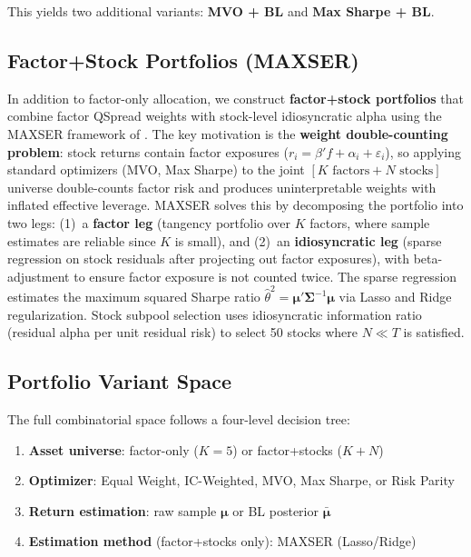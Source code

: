 \documentclass[12pt,a4paper]{article}
\begin{document}
This yields two additional variants: \textbf{MVO + BL} and \textbf{Max Sharpe + BL}.

\subsection{Factor+Stock Portfolios (MAXSER)}

In addition to factor-only allocation, we construct \textbf{factor+stock portfolios} that combine factor QSpread weights with stock-level idiosyncratic alpha using the MAXSER framework of \citet{ao2019approaching}. The key motivation is the \textbf{weight double-counting problem}: stock returns contain factor exposures ($r_i = \beta' f + \alpha_i + \varepsilon_i$), so applying standard optimizers (MVO, Max Sharpe) to the joint $[K \text{ factors} + N \text{ stocks}]$ universe double-counts factor risk and produces uninterpretable weights with inflated effective leverage. MAXSER solves this by decomposing the portfolio into two legs: (1)~a \textbf{factor leg} (tangency portfolio over $K$ factors, where sample estimates are reliable since $K$ is small), and (2)~an \textbf{idiosyncratic leg} (sparse regression on stock residuals after projecting out factor exposures), with beta-adjustment to ensure factor exposure is not counted twice. The sparse regression estimates the maximum squared Sharpe ratio $\hat{\theta}^2 = \boldsymbol{\mu}'\boldsymbol{\Sigma}^{-1}\boldsymbol{\mu}$ via Lasso and Ridge regularization. Stock subpool selection uses idiosyncratic information ratio (residual alpha per unit residual risk) to select 50 stocks where $N \ll T$ is satisfied.

\subsection{Portfolio Variant Space}

The full combinatorial space follows a four-level decision tree:
\begin{enumerate}[noitemsep]
    \item \textbf{Asset universe}: factor-only ($K=5$) or factor+stocks ($K + N$)
    \item \textbf{Optimizer}: Equal Weight, IC-Weighted, MVO, Max Sharpe, or Risk Parity
    \item \textbf{Return estimation}: raw sample $\boldsymbol{\mu}$ or BL posterior $\bar{\boldsymbol{\mu}}$
    \item \textbf{Estimation method} (factor+stocks only): MAXSER (Lasso/Ridge)
\end{enumerate}
\end{document}
